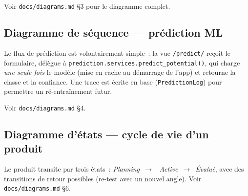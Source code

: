Voir \texttt{docs/diagrams.md} \S3 pour le diagramme complet.

\subsection{Diagramme de séquence --- prédiction ML}

Le flux de prédiction est volontairement simple~: la vue
\texttt{/predict/} reçoit le formulaire, délègue à
\texttt{prediction.services.predict\_potential()}, qui charge \emph{une
seule fois} le modèle (mise en cache au démarrage de l'app) et retourne la
classe et la confiance. Une trace est écrite en base
(\texttt{PredictionLog}) pour permettre un ré-entraînement futur.

Voir \texttt{docs/diagrams.md} \S4.

\subsection{Diagramme d'états --- cycle de vie d'un produit}

Le produit transite par trois états~: \emph{Planning}~$\rightarrow$~%
\emph{Active}~$\rightarrow$~\emph{Évalué}, avec des transitions de retour
possibles (re-test avec un nouvel angle). Voir \texttt{docs/diagrams.md}
\S6.
